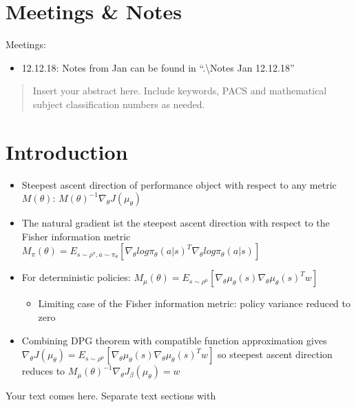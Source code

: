 \section{Meetings \& Notes}

Meetings:
\begin{itemize}
	\item 12.12.18: Notes from Jan can be found in ``.\textbackslash Notes Jan 12.12.18''
\end{itemize}


\newpage
\begin{abstract}
Insert your abstract here. Include keywords, PACS and mathematical
subject classification numbers as needed.
\end{abstract}

\section{Introduction}
\begin{itemize}
\item Steepest ascent direction of performance object with respect to any metric $M(\theta)$: $M(\theta)^{-1}\nabla_{\theta}J(\mu_{\theta})$
\item The natural gradient ist the steepest ascent direction with respect to the Fisher information metric $M_{\pi}(\theta)=E_{s\sim\rho^{\pi},a\sim\pi_{\theta}}[\nabla_{\theta}log\pi_{\theta}(a|s)^{T}\nabla_{\theta}log\pi_{\theta}(a|s)]$
\item For deterministic policies: $M_{\mu}(\theta)=E_{s\sim\rho^{\mu}}[\nabla_{\theta}\mu_{\theta}(s)\nabla_{\theta}\mu_{\theta}(s)^{T}w]$
\begin{itemize}
\item Limiting case of the Fisher information metric: policy variance reduced to zero
\end{itemize}
\item Combining DPG theorem with compatible function approximation gives $\nabla_{\theta}J(\mu_{\theta})=E_{s\sim\rho^{\mu}}[\nabla_{\theta}\mu_{\theta}(s)\nabla_{\theta}\mu_{\theta}(s)^{T}w]$ so steepest ascent direction reduces to $M_{\mu}(\theta)^{-1}\nabla_{\theta}J_{\beta}(\mu_{\theta})=w$
\end{itemize}
\label{intro}
Your text comes here. Separate text sections with
